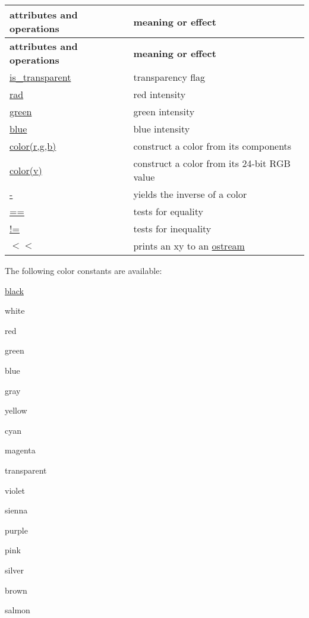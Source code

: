 \tabulinesep=1mm
\begin{longtabu} spread 0pt [c]{*{2}{|X[-1]}|}
\hline
\rowcolor{\tableheadbgcolor}\textbf{ attributes and operations }&\textbf{ meaning or effect  }\\
\endfirsthead
\hline
\endfoot
\hline
\rowcolor{\tableheadbgcolor}\textbf{ attributes and operations }&\textbf{ meaning or effect  }\\
\endhead
\hyperlink{classhwlib_1_1color_a2bb850a5013f0f4a78b29bd09444fb21}{is\+\_\+transparent} &transparency flag \\
\hyperlink{classhwlib_1_1color_a63b0cdaa1bc446995cc8b8724a2ab866}{rad} &red intensity \\
\hyperlink{classhwlib_1_1color_ab87f25b9aba71151e056b570e7304c89}{green} &green intensity \\
\hyperlink{classhwlib_1_1color_a9d57edec257fb2626157befb791a6a96}{blue} &blue intensity \\
\hyperlink{classhwlib_1_1color_a35fd6b9a03fa8f5b78bbf55052760bd3}{color(r,g,b)} &construct a color from its components \\
\hyperlink{classhwlib_1_1color_aa8d2263ebf5efe2221171217166a669f}{color(v)} &construct a color from its 24-\/bit R\+GB value \\
\hyperlink{classhwlib_1_1color_a6461f61a4b0e1b5058b765eed55aeec7}{-\/} &yields the inverse of a color \\
\hyperlink{classhwlib_1_1color_a3d40dc7bb1585a139e28ca29fa77d5ac}{==} &tests for equality \\
\hyperlink{classhwlib_1_1color_af4c0560e4fbd233b4a2fbc922ed5528a}{!=} &tests for inequality \\
\hyperlink{classhwlib_1_1color_a4280fa2c98671d364a67f56cbd7ec609}{$<$$<$} &prints an xy to an \hyperlink{classhwlib_1_1ostream}{ostream} \\
\end{longtabu}
The following color constants are available\+:
\begin{DoxyItemize}
\item \hyperlink{namespacehwlib_aa9c056fa29bc9af9f55d4b774bb3898a}{black}
\item white
\item red
\item green
\item blue
\item gray
\item yellow
\item cyan
\item magenta
\item transparent
\item violet
\item sienna
\item purple
\item pink
\item silver
\item brown
\item salmon
\end{DoxyItemize}

